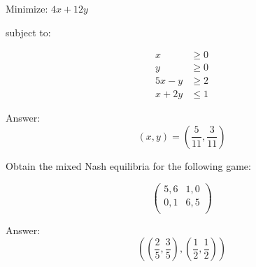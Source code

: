 \documentclass{article}
\begin{document}
\hrulefill
\begin{multicols}{2}

    Minimize: \(4x + 12 y\)

    subject to:

    \begin{align*}
        x & \geq 0\\
        y & \geq 0\\
        5 x - y &\geq 2\\
        x + 2y &\leq 1
    \end{align*}
    

    \columnbreak

    Answer: \[ (x, y) = \left(\frac{5}{11}, \frac{3}{11}\right) \]

\end{multicols}

\hrulefill
\begin{multicols}{2}

    Obtain the mixed Nash equilibria for the following game:

    \[
        \begin{pmatrix}
            5, 6 & 1, 0\\
            0, 1 & 6, 5\\
        \end{pmatrix}
    \]

    \columnbreak

    Answer: \[ \left(\left(\frac{2}{5}, \frac{3}{5}\right), \left(\frac{1}{2}, \frac{1}{2}\right)\right) \]

\end{multicols}
\end{document}
